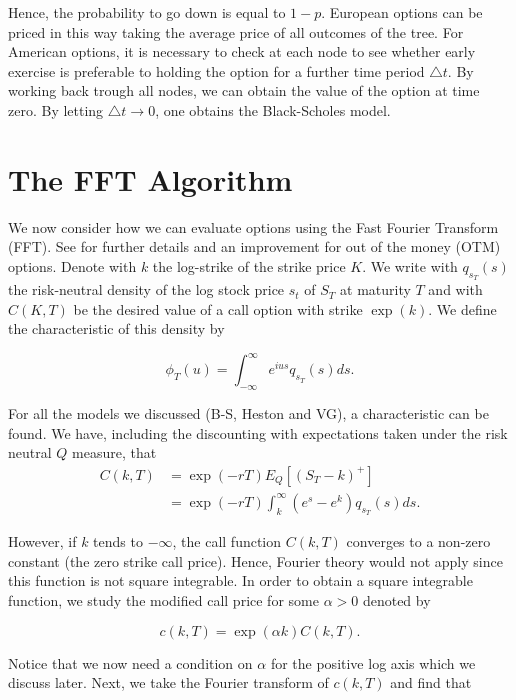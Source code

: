 \documentclass[12pt,a4paper,oneside]{book}
\begin{document}
Hence, the probability to go down is equal to $1-p$. European options can be priced in this way taking the average price of all outcomes of the tree. For American options, it is necessary
to check at each node to see whether early exercise is preferable to holding the option for a further time period $\triangle t$. By working back trough all nodes, we can obtain the value of the option at time zero. By letting $\triangle t \rightarrow 0$, one obtains the Black-Scholes model.  


\section{The FFT Algorithm}\label{Fast_Fourrier_transform}

We now consider how we can evaluate options using the Fast Fourier
Transform (FFT). See \cite{carr1999option} for further details and an improvement for out of the money (OTM) options. Denote with $k$ the log-strike of the strike price $K$. We write with $q_{s_T}(s)$ the risk-neutral density of the log stock price $s_t$ of $S_T$ at maturity $T$ and with $C(K,T)$ be the desired value of a call option with strike $\exp(k)$. We define the characteristic of this density by 

\begin{equation}
\phi_T(u) = \int_{-\infty}^{\infty} e^{ius} q_{s_T}(s) ds.
\end{equation} 

For all the models we discussed (B-S, Heston and VG), a characteristic can be found. We have, including the discounting with expectations
taken under the risk neutral $Q$ measure, that
\begin{align}
C(k,T) &= \exp(-rT) E_Q [ (S_T - k)^+] \nonumber \\
 		&=  \exp(-rT) \int_{k}^{\infty} (e^{s} - e^k) q_{s_T}(s) ds.
\end{align}

However, if $k$ tends to $-\infty$, the call function $C(k, T)$ converges to a non-zero constant (the zero strike call price). Hence, Fourier theory would not apply since this function is not square integrable. In order to obtain a square integrable function, we study the modified call price for some $\alpha > 0$ denoted by 

\begin{equation}
c(k,T) = \exp(\alpha k) C(k,T).
\end{equation} 

Notice that we now need a condition on $\alpha$ for the positive log axis which we discuss later. Next, we take the Fourier transform of $c(k,T)$ and find that 
\end{document}
